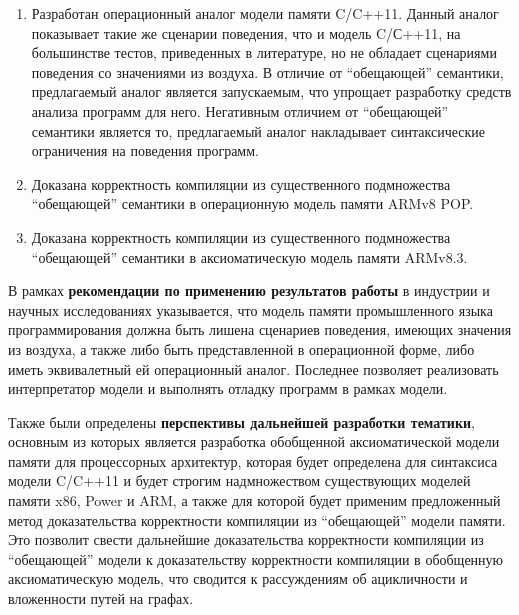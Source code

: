 \begin{enumerate}
  \item Разработан операционный аналог модели памяти C/C++11.
    Данный аналог показывает такие же сценарии поведения, что и модель C/С++11, на большинстве
    тестов, приведенных в литературе, но не обладает сценариями поведения со значениями из воздуха.
    В отличие от ``обещающей'' семантики, предлагаемый аналог является запускаемым, что упрощает
    разработку средств анализа программ для него. Негативным отличием от ``обещающей'' семантики является то,
    предлагаемый аналог накладывает синтаксические ограничения на поведения программ.
  \item Доказана корректность компиляции из существенного подмножества ``обещающей'' семантики в операционную модель
    памяти ARMv8 POP.
  \item Доказана корректность компиляции из существенного подмножества ``обещающей'' семантики в
    аксиоматическую модель памяти ARMv8.3.
\end{enumerate}

В рамках \textbf{рекомендации по применению результатов работы} в индустрии и научных исследованиях указывается,
что модель памяти промышленного языка программирования должна быть лишена сценариев поведения, имеющих значения
из воздуха, а также либо быть представленной в операционной форме, либо иметь эквивалетный ей операционный аналог.
Последнее позволяет реализовать интерпретатор модели и выполнять отладку программ в рамках модели.

Также были определены \textbf{перспективы дальнейшей разработки тематики}, основным из которых является
разработка обобщенной аксиоматической модели памяти для процессорных архитектур, которая будет
определена для синтаксиса модели C/C++11 и будет строгим надмножеством существующих моделей памяти
x86, Power и ARM, а также для которой будет применим предложенный метод доказательства корректности компиляции
из ``обещающей'' модели памяти. Это позволит свести дальнейшие доказательства корректности компиляции из
``обещающей'' модели к доказательству корректности компиляции в обобщенную аксиоматическую модель, что
сводится к рассуждениям об ацикличности и вложенности путей на графах.

